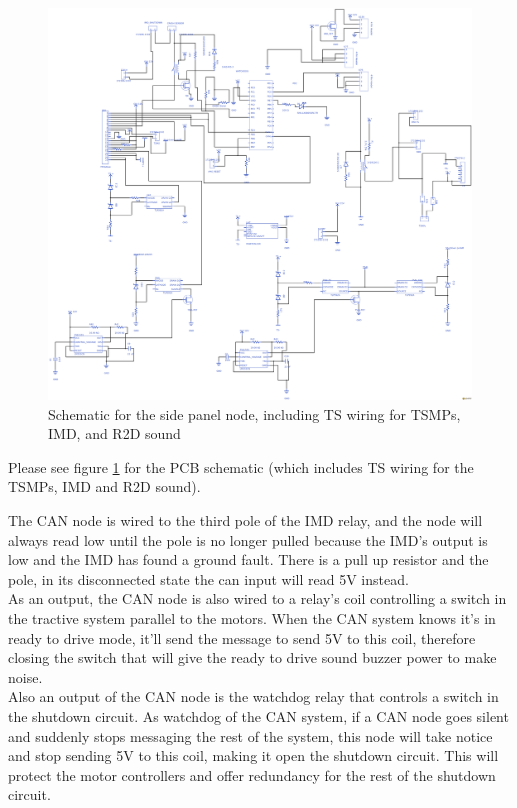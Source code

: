 \documentclass{article}
\begin{document}
            \begin{figure}
                \includegraphics[height= 0.7 \textheight]{Panel-Board}
                \caption{Schematic for the side panel node, including TS wiring for TSMPs, IMD, and R2D sound}
                \label{panelnode}
            \end{figure}

            Please see figure \ref{panelnode} for the PCB schematic (which includes TS wiring for the TSMPs, IMD and R2D sound).

            The CAN node is wired to the third pole of the IMD relay, and the node will always read low until the pole is no longer pulled because the IMD's output is low and the IMD has found a ground fault. There is a pull up resistor and the pole, in its disconnected state the can input will read 5V instead.\\

            As an output, the CAN node is also wired to a relay's coil controlling a switch in the tractive system parallel to the motors. When the CAN system knows it's in ready to drive mode, it'll send the message to send 5V to this coil, therefore closing the switch that will give the ready to drive sound buzzer power to make noise.\\

            Also an output of the CAN node is the watchdog relay that controls a switch in the shutdown circuit. As watchdog of the CAN system, if a CAN node goes silent and suddenly stops messaging the rest of the system, this node will take notice and stop sending 5V to this coil, making it open the shutdown circuit. This will protect the motor controllers and offer redundancy for the rest of the shutdown circuit.
\end{document}
